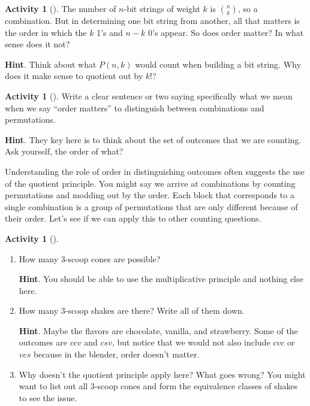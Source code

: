 \documentclass[10pt,]{book}
\theoremstyle{plain}
\theoremstyle{definition}
\theoremstyle{definition}
\theoremstyle{definition}
\newtheorem{activity}[project]{Activity}
\theoremstyle{definition}
\numberwithin{equation}{chapter}
\begin{document}
\begin{activity}[]\label{activity-60}
\hypertarget{p-702}{}%
The number of \(n\)-bit strings of weight \(k\) is \(\binom{n}{k}\), so a combination.  But in determining one bit string from another, all that matters is the order in which the \(k\) 1's and \(n-k\) 0's appear.  So does order matter?  In what sense does it not?%
\par\smallskip%
\noindent\textbf{Hint}.\hypertarget{hint-53}{}\quad%
\hypertarget{p-703}{}%
Think about what \(P(n,k)\) would count when building a bit string.  Why does it make sense to quotient out by \(k!\)?%
\end{activity}
\begin{activity}[]\label{activity-61}
\hypertarget{p-704}{}%
Write a clear sentence or two saying specifically what we mean when we say ``order matters'' to distinguish between combinations and permutations.%
\par\smallskip%
\noindent\textbf{Hint}.\hypertarget{hint-54}{}\quad%
\hypertarget{p-705}{}%
They key here is to think about the set of outcomes that we are counting.  Ask yourself, the order of what?%
\end{activity}
\hypertarget{p-706}{}%
Understanding the role of order in distinguishing outcomes often suggests the use of the quotient principle.  You might say we arrive at combinations by counting permutations and modding out by the order.  Each block that corresponds to a single combination is a group of permutations that are only different because of their order.  Let's see if we can apply this to other counting questions.%
\begin{activity}[]\label{activity-62}
\begin{enumerate}[font=\bfseries,label=(\alph*),ref=\alph*]
\item\label{task-81} \hypertarget{p-707}{}%
How many 3-scoop cones are possible?%
\par\smallskip%
\noindent\textbf{Hint}.\hypertarget{hint-55}{}\quad%
\hypertarget{p-708}{}%
You should be able to use the multiplicative principle and nothing else here.%
\item\label{task-82} \hypertarget{p-709}{}%
How many 3-scoop shakes are there?  Write all of them down.%
\par\smallskip%
\noindent\textbf{Hint}.\hypertarget{hint-56}{}\quad%
\hypertarget{p-710}{}%
Maybe the flavors are chocolate, vanilla, and strawberry.  Some of the outcomes are \(ccv\) and \(csv\), but notice that we would not also include \(cvc\) or \(vcs\) because in the blender, order doesn't matter.%
\item\label{task-83} \hypertarget{p-711}{}%
Why doesn't the quotient principle apply here?  What goes wrong?  You might want to list out all 3-scoop cones and form the equivalence classes of shakes to see the issue.%
\end{enumerate}
\end{activity}
\end{document}
